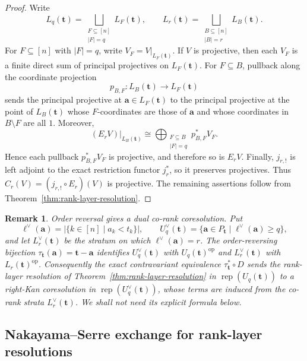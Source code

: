 \documentclass[10pt,a4paper]{amsart}
\newtheorem{remark}[theorem]{Remark}
\newcommand{\Rep}{\operatorname{rep}}
\begin{document}
\begin{proof}
Write
\[
L_q(\mathbf t)=\bigsqcup_{\substack{F\subseteq[n]\\|F|=q}}L_F(\mathbf t),
\qquad
L_r(\mathbf t)=\bigsqcup_{\substack{B\subseteq[n]\\|B|=r}}L_B(\mathbf t).
\]
For $F\subseteq[n]$ with $|F|=q$, write $V_F=V|_{L_F(\mathbf t)}$.  If $V$ is projective, then
each $V_F$ is a finite direct sum of principal projectives on
$L_F(\mathbf t)$.  For $F\subseteq B$, pullback along
the coordinate projection
\[
p_{B,F}:L_B(\mathbf t)\longrightarrow L_F(\mathbf t)
\]
sends the principal projective at $\mathbf a\in L_F(\mathbf t)$ to the
principal projective at the point of $L_B(\mathbf t)$ whose $F$-coordinates
are those of $\mathbf a$ and whose coordinates in $B\setminus F$ are all
$1$.  Moreover,
\[
(E_rV)|_{L_B(\mathbf t)}
\cong
\bigoplus_{\substack{F\subseteq B\\|F|=q}}p_{B,F}^*V_F.
\]
Hence each pullback $p_{B,F}^*V_F$ is projective, and therefore so is
$E_rV$.  Finally, $j_{r,!}$ is left adjoint to the exact restriction
functor $j_r^*$, so it preserves projectives.  Thus
$C_r(V)=(j_{r,!}\circ E_r)(V)$ is projective.  The remaining assertions follow from
Theorem~\ref{thm:rank-layer-resolution}.
\end{proof}

\begin{remark}\label{rem:dual-rank-resolution}
Order reversal gives a dual co-rank coresolution.  Put
\[
\ell^\vee(\mathbf a)=|\{k\in[n]\mid a_k<t_k\}|,
\qquad
U_q^\vee(\mathbf t)=\{\mathbf a\in P_{\mathbf t}\mid
\ell^\vee(\mathbf a)\ge q\},
\]
and let $L_r^\vee(\mathbf t)$ be the stratum on which
$\ell^\vee(\mathbf a)=r$.  The order-reversing bijection
$\tau_{\mathbf t}(\mathbf a)=\mathbf t-\mathbf a$ identifies
$U_q^\vee(\mathbf t)$ with $U_q(\mathbf t)^{\mathrm{op}}$ and
$L_r^\vee(\mathbf t)$ with $L_r(\mathbf t)^{\mathrm{op}}$.  Consequently the
exact contravariant equivalence $\tau_{\mathbf t}^*\circ D$ sends the
rank-layer resolution of Theorem~\ref{thm:rank-layer-resolution} in
$\Rep(U_q(\mathbf t))$ to a right-Kan coresolution in
$\Rep(U_q^\vee(\mathbf t))$, whose terms are induced from the co-rank strata
$L_r^\vee(\mathbf t)$.  We shall not need its explicit formula below.
\end{remark}

\subsection{Nakayama--Serre exchange for rank-layer resolutions}\label{subsec:higher-nakayama}
\end{document}

